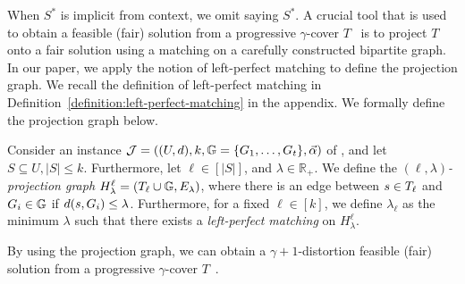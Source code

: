 When $S^*$ is implicit from context, we omit saying \wrt $S^*$.
A crucial tool that is used to obtain a feasible (fair) solution from a progressive $\gamma$-cover $T$~\cite{gadekar2025fair,jones2020fair} is to project $T$ onto a fair solution using a matching on a carefully constructed bipartite graph. 
In our paper, we apply the notion of left-perfect matching to define the projection graph. We recall the definition of left-perfect matching in Definition~\ref{definition:left-perfect-matching} in the appendix.
We formally define the projection graph below.
\begin{definition}
Consider an instance $\mathcal{J}=((U,d),k,\mathbb{G}=\{G_1,\dots,G_t\},\vec{\alpha})$ of \fairkcenter, and let $S \subseteq U, |S|\le k$. Furthermore, let $\ell \in [|S|]$, and $\lambda \in \mathbb{R}_+$. 
We define the \emph{$(\ell, \lambda)$-projection graph}  $H^{\ell}_{\lambda} = (T_{\ell} \cup \mathbb{G}, E_{\lambda})$, where there is an edge between  $s \in T_{\ell}$ and $G_i \in \mathbb{G}$ if $d(s, G_i) \le \lambda$. Furthermore, for a fixed $\ell \in [k]$, we define $\lambda_{\ell}$ as the minimum $\lambda$ such that there exists a \emph{left-perfect matching} on $H^{\ell}_{\lambda}$. 
\end{definition}

By using the projection graph, we can obtain a $\gamma+1$-distortion feasible (fair) solution from a progressive $\gamma$-cover $T$~\cite{gadekar2025fair,jones2020fair}.




























